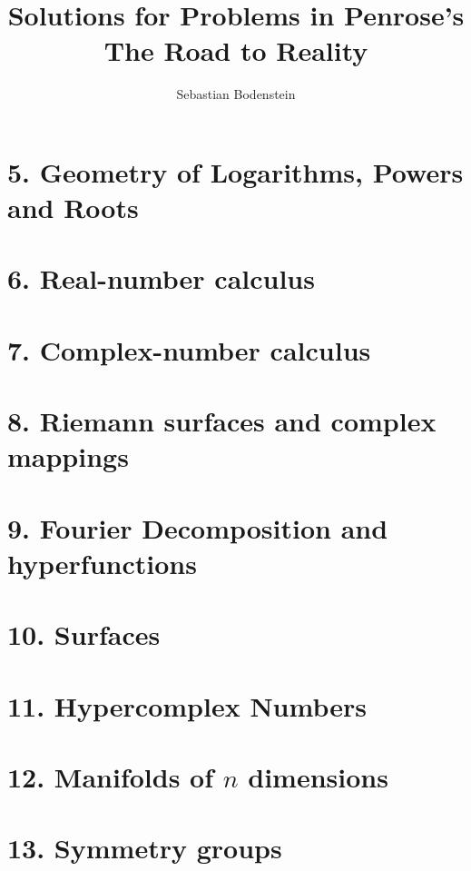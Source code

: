 \documentclass[a4paper,11pt]{article}
\author{Sebastian Bodenstein}
\title{Solutions for Problems in Penrose's The Road to Reality}
\begin{document}
\maketitle
\tableofcontents

\newpage
\section{5. Geometry of Logarithms, Powers and Roots}


\newpage
\section{6. Real-number calculus}


\newpage
\section{7. Complex-number calculus}


\newpage
\section{8. Riemann surfaces and complex mappings}


\newpage
\section{9. Fourier Decomposition and hyperfunctions}


\newpage
\section{10. Surfaces}


\newpage
\section{11. Hypercomplex Numbers}


\newpage
\section{12. Manifolds of $n$ dimensions}


\newpage
\section{13. Symmetry groups}

\end{document}
